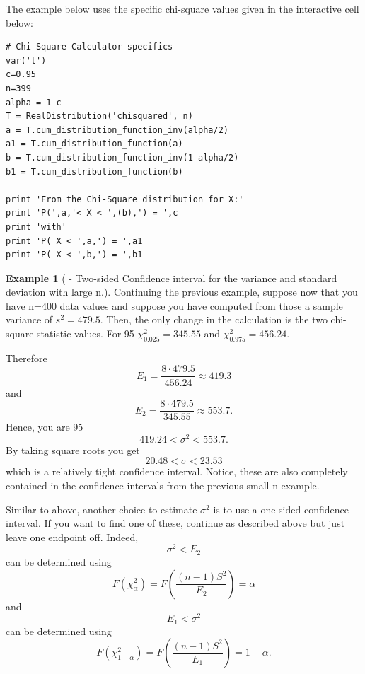 \documentclass[10pt,]{book}
\theoremstyle{plain}
\theoremstyle{definition}
\theoremstyle{definition}
\newtheorem{example}[theorem]{Example}
\theoremstyle{definition}
\numberwithin{equation}{section}
\newcommand{\lt}{ < }
\begin{document}
The example below uses the specific chi-square values given in the interactive cell below:

\begin{lstlisting}[style=sageinput]
# Chi-Square Calculator specifics
var('t')
c=0.95
n=399
alpha = 1-c
T = RealDistribution('chisquared', n)
a = T.cum_distribution_function_inv(alpha/2)
a1 = T.cum_distribution_function(a)
b = T.cum_distribution_function_inv(1-alpha/2)
b1 = T.cum_distribution_function(b)

print 'From the Chi-Square distribution for X:'
print 'P(',a,'< X < ',(b),') = ',c
print 'with'
print 'P( X < ',a,') = ',a1
print 'P( X < ',b,') = ',b1
\end{lstlisting}



\begin{example}[ - Two-sided Confidence interval for the variance and standard deviation with large n.]\label{example-32}
Continuing the previous example, suppose now that you have n=400 data values and suppose you have computed from those a sample variance of \(s^2 = 479.5\).  Then, the only change in the calculation is the two chi-square statistic values. For 95%
\(\chi_{0.025}^2 = 345.55\) and \(\chi_{0.975}^2 = 456.24\).  

Therefore
\begin{equation*} E_1 = \frac{8 \cdot 479.5}{456.24} \approx 419.3\end{equation*}
and
\begin{equation*} E_2 = \frac{8 \cdot 479.5}{345.55} \approx 553.7.\end{equation*}
Hence, you are 95%
\begin{equation*}419.24 \lt \sigma^2 \lt 553.7.\end{equation*}
By taking square roots you get
\begin{equation*}20.48 \lt \sigma \lt 23.53\end{equation*}
which is a relatively tight confidence interval.  Notice, these are also completely contained in the confidence intervals from the previous small n example.
%
\end{example}

%
\par

Similar to above, another choice to estimate \(\sigma ^2\) is to use a one sided confidence interval. If you want to find one of these, continue as described above but just leave one endpoint off.  Indeed, 
\begin{equation*}\sigma^2 \lt E_2\end{equation*}
can be determined using 
\begin{equation*} F(\chi^2_{\alpha} ) = F \left ( \frac{(n-1)S^2}{E_2} \right ) = \alpha\end{equation*}
and 
\begin{equation*}E_1 \lt \sigma^2 \end{equation*}
can be determined using
\begin{equation*} F(\chi^2_{1-\alpha} ) = F \left ( \frac{(n-1)S^2}{E_1} \right ) = 1 - \alpha.\end{equation*}
\end{document}
